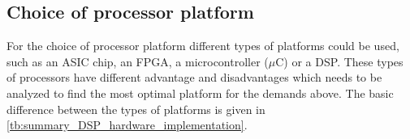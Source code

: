 %
%
%
%
%
%
%
%

\subsection{Choice of processor platform}
For the choice of processor platform different types of platforms could be used, such as an ASIC chip, an \gls{FPGA}, a microcontroller ($\mu$C) or a \gls{DSP}. These types of processors have different advantage and disadvantages which needs to be analyzed to find the most optimal platform for the demands above. The basic difference between the types of platforms is given in \autoref{tb:summary_DSP_hardware_implementation}. 

